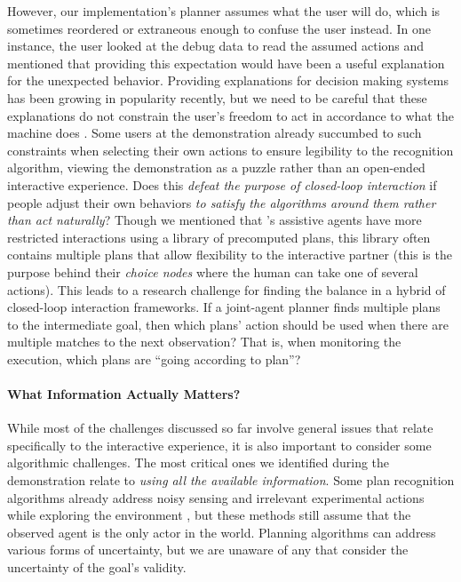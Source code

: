 \documentclass[letterpaper]{article} %
\begin{document}
However, our implementation's planner assumes what the user will do, which is sometimes reordered or extraneous enough to confuse the user instead.  In one instance, the user looked at the debug data to read the assumed actions and mentioned that providing this expectation would have been a useful explanation for the unexpected behavior.  Providing explanations for decision making systems \cite{xaip} has been growing in popularity recently, but we need to be careful that these explanations do not constrain the user's freedom to act in accordance to what the machine does \cite{DBLP:conf/aaaifs/CastroRMB17}.  Some users at the demonstration already succumbed to such constraints when selecting their own actions to ensure legibility to the recognition algorithm, viewing the demonstration as a puzzle rather than an open-ended interactive experience.  Does this \textit{defeat the purpose of closed-loop interaction} if people adjust their own behaviors \textit{to satisfy the algorithms around them rather than act naturally}?  Though we mentioned that \citeauthor{jair_levineWilliams}'s  assistive agents have more restricted interactions using %
a library of precomputed plans, this library often contains multiple plans that allow flexibility to the interactive partner (this is the purpose behind their \textit{choice nodes} where the human can take one of several actions).  This leads to a research challenge for finding the balance in a hybrid of closed-loop interaction frameworks.  If a joint-agent planner finds multiple plans to the intermediate goal, then which plans' action should be used when there are multiple matches to the next observation?  That is, when monitoring the execution, which plans are ``going according to plan''?




\paragraph{What Information Actually Matters?} While most of the challenges discussed so far involve general issues that relate specifically to the interactive experience, it is also important to consider some algorithmic challenges. %
The most critical ones we identified during the demonstration relate to \textit{using all the available information}.  Some plan recognition algorithms already address noisy sensing \cite{DBLP:conf/ijcai/SohrabiRU16} and irrelevant experimental actions while exploring the environment \cite{DBLP:journals/tist/MirskyGS17}, but these methods still assume that the observed agent is the only actor in the world.  Planning algorithms can address various forms of uncertainty, but we are unaware of any that consider the uncertainty of the goal's validity.
\end{document}
